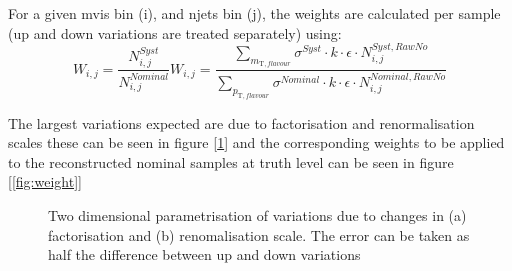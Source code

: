 For a given mvis bin (i), and njets bin (j), the weights are calculated per sample (up and down variations are treated separately) using:
\[W_{i,j}=
\frac{N_{i,j}^{Syst}}{N_{i,j}^{Nominal}}W_{i,j}
= \frac{\sum_{m_{\mathrm{T},flavour}}\sigma^{Syst}\cdot k\cdot\epsilon\cdot N_{i,j}^{Syst,RawNo}}{\sum_{p_{\mathrm{T},flavour}}\sigma^{Nominal}\cdot k\cdot\epsilon\cdot N_{i,j}^{Nominal,RawNo}}
\]

The largest variations expected are due to factorisation and renormalisation scales these can be seen in figure [\ref{fig:scales}] and the corresponding weights to be applied to the reconstructed nominal samples at truth level can be seen in figure [\ref{fig:weight}]

\begin{figure}[h!]
  \centering

   \caption{Two dimensional parametrisation of variations due to changes in (a) factorisation and (b) renomalisation scale. The error can be taken as half the difference between up and down variations}
  \label{fig:scales}
\end{figure}

